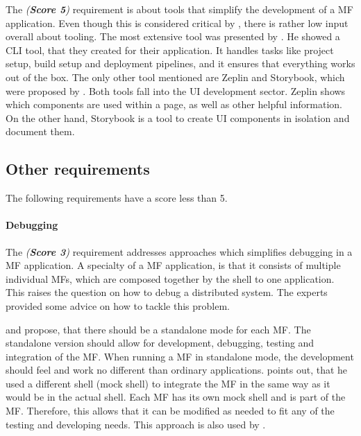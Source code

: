 The \textit{ (\textbf{Score 5})} requirement is about tools that simplify the development of a \ac{MF} application.
Even though this is considered critical by \textciteJovanovic{}, there is rather low input overall about tooling.
The most extensive tool was presented by \textcite{Grijzen.2019}.
He showed a \ac{CLI} tool, that they created for their application.
It handles tasks like project setup, build setup and deployment pipelines, and it ensures that everything works out of the box.
The only other tool mentioned are Zeplin and Storybook, which were proposed by \textciteRehm{}.
Both tools fall into the \ac{UI} development sector.
Zeplin shows which components are used within a page, as well as other helpful information\footnotemark.
On the other hand, Storybook is a tool to create \ac{UI} components in isolation and document them\footnotemark.





\subsection{Other requirements}

The following requirements have a score less than 5.



\paragraph{Debugging}\label{cha:requirement_detail_developer_debugging}

The \textit{ (\textbf{Score 3})} requirement addresses approaches which simplifies debugging in a \ac{MF} application.
A specialty of a \ac{MF} application, is that it consists of multiple individual \acp{MF}, which are composed together by the shell to one application.
This raises the question on how to debug a distributed system.
The experts provided some advice on how to tackle this problem.

\textciteSteyer{} and \textcite{Laug.2018} propose, that there should be a standalone mode for each \ac{MF}.
The standalone version should allow for development, debugging, testing and integration of the \ac{MF}.
When running a \ac{MF} in standalone mode, the development should feel and work no different than ordinary applications.
\citeauthor{Laug.2018} points out, that he used a different shell (mock shell) to integrate the \ac{MF} in the same way as it would be in the actual shell.
Each \ac{MF} has its own mock shell and is part of the \ac{MF}.
Therefore, this allows that it can be modified as needed to fit any of the testing and developing needs.
This approach is also used by \textciteRehm{}.

